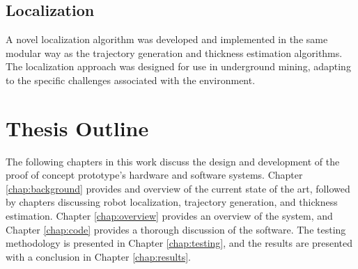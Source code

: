 \subsection{Localization}
A novel localization algorithm was developed and implemented in the same modular way as the trajectory generation and thickness estimation algorithms. The localization approach was designed for use in underground mining, adapting to the specific challenges associated with the environment.\\

\section{Thesis Outline}
\label{sec:outline}

The following chapters in this work discuss the design and development of the proof of concept prototype's hardware and software systems. Chapter \ref{chap:background} provides and overview of the current state of the art, followed by chapters discussing robot localization, trajectory generation, and thickness estimation. Chapter \ref{chap:overview} provides an overview of the system, and Chapter \ref{chap:code} provides a thorough discussion of the software. The testing methodology is presented in Chapter \ref{chap:testing}, and the results are presented with a conclusion in Chapter \ref{chap:results}.\\